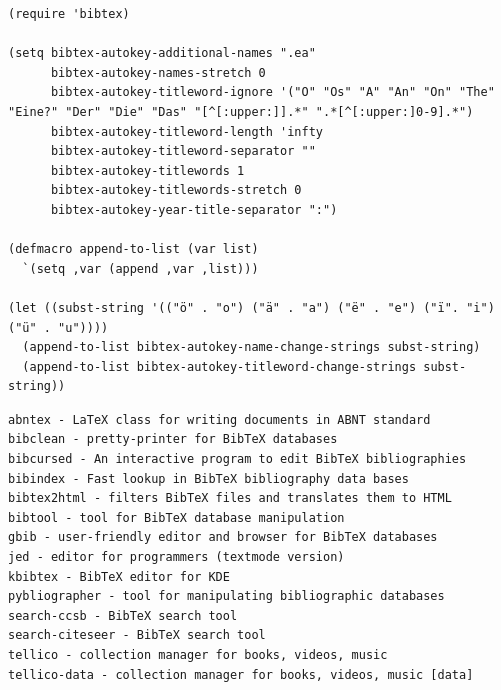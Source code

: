 \documentclass[12pt,brazil]{book}
\begin{document}
\begin{verbatim}
(require 'bibtex)

(setq bibtex-autokey-additional-names ".ea"
      bibtex-autokey-names-stretch 0
      bibtex-autokey-titleword-ignore '("O" "Os" "A" "An" "On" "The" "Eine?" "Der" "Die" "Das" "[^[:upper:]].*" ".*[^[:upper:]0-9].*")
      bibtex-autokey-titleword-length 'infty
      bibtex-autokey-titleword-separator ""
      bibtex-autokey-titlewords 1
      bibtex-autokey-titlewords-stretch 0
      bibtex-autokey-year-title-separator ":")

(defmacro append-to-list (var list)
  `(setq ,var (append ,var ,list)))

(let ((subst-string '(("ö" . "o") ("ä" . "a") ("ë" . "e") ("ï". "i") ("ü" . "u"))))
  (append-to-list bibtex-autokey-name-change-strings subst-string)
  (append-to-list bibtex-autokey-titleword-change-strings subst-string))
\end{verbatim}

\begin{verbatim}
abntex - LaTeX class for writing documents in ABNT standard
bibclean - pretty-printer for BibTeX databases
bibcursed - An interactive program to edit BibTeX bibliographies
bibindex - Fast lookup in BibTeX bibliography data bases
bibtex2html - filters BibTeX files and translates them to HTML
bibtool - tool for BibTeX database manipulation
gbib - user-friendly editor and browser for BibTeX databases
jed - editor for programmers (textmode version)
kbibtex - BibTeX editor for KDE
pybliographer - tool for manipulating bibliographic databases
search-ccsb - BibTeX search tool
search-citeseer - BibTeX search tool
tellico - collection manager for books, videos, music
tellico-data - collection manager for books, videos, music [data]
\end{verbatim}






\end{document}

